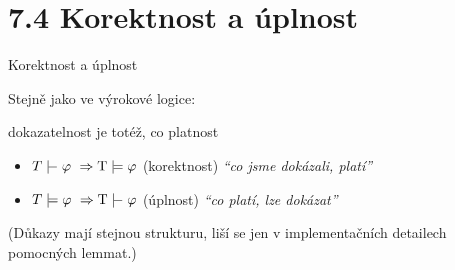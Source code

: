 \documentclass{beamer}
\begin{document}
\section{7.4 Korektnost a úplnost}


\begin{frame}{Korektnost a úplnost}
    
    Stejně jako ve výrokové logice:
    
    \begin{center}
        \alert{dokazatelnost} je totéž, co \alert{platnost}    
    \end{center}    

    \begin{itemize}
        \item \alert{$T\proves\varphi\ \Rightarrow\T\models\varphi$} \hspace{0.5cm} (korektnost) \hfill {\it``co jsme dokázali, platí''}
        \item\alert{$T\models\varphi\ \Rightarrow\T\proves\varphi$}  \hspace{0.5cm} (úplnost) \hfill {\it ``co platí, lze dokázat''}
    \end{itemize} 

    \bigskip

    (Důkazy mají stejnou strukturu, liší se jen v implementačních detailech pomocných lemmat.)
 
\end{frame}
\end{document}
